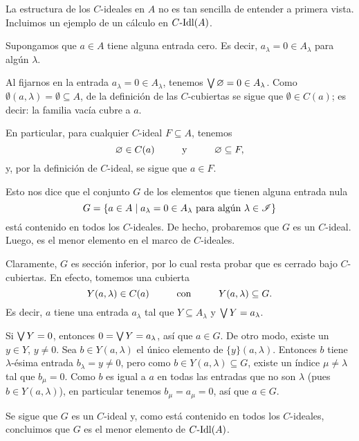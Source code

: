 La estructura de los $C$-ideales en $A$ no es tan sencilla
de entender a primera vista.
Incluimos un ejemplo de un cálculo en $C\text{-}\mathrm{Idl}(A)$.

\begin{example}
    Supongamos que $a\in A$ tiene
    alguna entrada cero.
    Es decir, $a_\lambda=0\in A_\lambda$ para algún $\lambda$.
    
    Al fijarnos en la entrada $a_\lambda=0\in A_\lambda$,
    tenemos $\bigvee\varnothing =0\in A_\lambda$.
    Como $\emptyset(a,\lambda)=\emptyset\subseteq A$,
    de la definición de las $C$-cubiertas
    se sigue que $\emptyset\in C(a)$;
    es decir: la familia vacía cubre a $a$.
    
    En particular, para cualquier $C$-ideal $F\subseteq A$,
    tenemos
    \[
        \emptyset \in C(a)
        \hspace{10mm} \text{y} \hspace{10mm}
        \emptyset\subseteq F
    ,\]
    y, por la definición de $C$-ideal, se sigue que $a\in F$.
    
    Esto nos dice que el conjunto $G$ de los elementos que tienen
    alguna entrada nula
    \[
        G=\{a\in A \mid a_\lambda = 0\in A_\lambda
        \text{ para algún } \lambda\in \mathscr{I}\}
    \]
    está contenido en todos los $C$-ideales.
    De hecho, probaremos que $G$ es un $C$-ideal.
    Luego, es el menor elemento en el marco de $C$-ideales.

    Claramente, $G$ es sección inferior, por lo cual resta
    probar que es cerrado bajo $C$-cubiertas.
    En efecto, tomemos una cubierta
    \[
        Y(a,\lambda) \in C(a)
        \hspace{10mm} \text{con} \hspace{10mm}
        Y(a,\lambda) \subseteq G
    .\]
    Es decir, $a$ tiene una entrada $a_\lambda$ tal que
    $Y\subseteq A_\lambda$ y $\bigvee Y=a_\lambda$.
    
    Si $\bigvee Y=0$, entonces $0=\bigvee Y=a_\lambda$, así que $a\in G$.
    De otro modo, existe un $y\in Y$, $y\neq 0$.
    Sea $b\in Y(a,\lambda)$ el único elemento de
    $\{y\}(a,\lambda)$.
    Entonces $b$ tiene $\lambda$-ésima entrada
    $b_\lambda=y\neq 0$, pero como $b\in Y(a,\lambda)\subseteq G$,
    existe un índice $\mu\neq\lambda$ tal que $b_\mu = 0$.
    Como $b$ es igual a $a$ en todas las entradas
    que no son $\lambda$ (pues $b\in Y(a,\lambda)$),
    en particular tenemos $b_\mu=a_\mu=0$, así que $a\in G$.
    
    Se sigue que $G$ es un $C$-ideal y, como está contenido
    en todos los $C$-ideales, concluimos que $G$ es el
    menor elemento de $C\text{-}\mathrm{Idl}(A)$.
\end{example}


